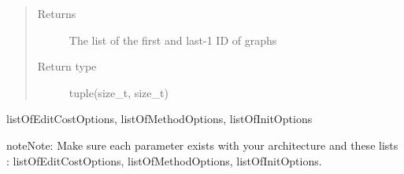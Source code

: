 \documentclass[letterpaper,10pt,english]{sphinxmanual}
\begin{document}
\begin{fulllineitems}
\begin{quote}
\begin{description}
\begin{itemize}
\end{itemize}

\item[{Returns}] \leavevmode
The list of the first and last-1 ID of graphs

\item[{Return type}] \leavevmode
tuple(size\_t, size\_t)

\end{description}\end{quote}




listOfEditCostOptions, listOfMethodOptions, listOfInitOptions



\begin{notice}{note}{Note:}
Make sure each parameter exists with your architecture and these lists : listOfEditCostOptions, listOfMethodOptions, listOfInitOptions.
\end{notice}

\end{fulllineitems}

\end{document}
